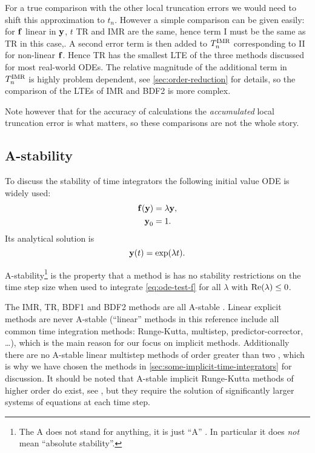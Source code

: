 For a true comparison with the other local truncation errors we would need to shift this approximation to $t_n$.
However a simple comparison can be given easily: for ${\boldsymbol{\mathrm{f}}}$ linear in $\boldsymbol{\mathrm{y}}$, $t$ TR and IMR are the same, hence term I must be the same as TR in this case,.
A second error term is then added to $T_n^{\mathrm{IMR}}$ corresponding to II for non-linear ${\boldsymbol{\mathrm{f}}}$.
Hence TR has the smallest LTE of the three methods discussed for most real-world ODEs.
The relative magnitude of the additional term in $T_n^{\mathrm{IMR}}$ is highly problem dependent, see \cref{sec:order-reduction} for details, so the comparison of the LTEs of IMR and BDF2 is more complex.

Note however that for the accuracy of calculations the \emph{accumulated} local truncation error is what matters, so these comparisons are not the whole story.

\subsection{A-stability}
\label{sec:A-stability}

To discuss the stability of time integrators the following initial value ODE is widely used:
\begin{equation}
  \begin{aligned}
    {\boldsymbol{\mathrm{f}}{\left( \boldsymbol{\mathrm{y}}\right)}} &= \lambda \boldsymbol{\mathrm{y}}, \\
    \boldsymbol{\mathrm{y}}_0 &= 1.
    \label{eq:ode-test-f}
  \end{aligned}
\end{equation}
Its analytical solution is
\begin{equation}
  \boldsymbol{\mathrm{y}}(t) = \exp(\lambda t).
\end{equation}

A-stability\footnote{The A does not stand for anything, it is just ``A'' \cite[40]{HairerWanner}. In particular it does \emph{not} mean ``absolute stability''.} is the property that a method is has no stability restrictions on the time step size when used to integrate \cref{eq:ode-test-f} for all $\lambda$ with $\operatorname{Re}(\lambda) \leq 0$.

The IMR, TR, BDF1 and BDF2 methods are all A-stable \cite[pgs. 43, 251]{HairerWanner}.
Linear explicit methods are never A-stable \cite{Nevanlinna1974} (``linear'' methods in this reference include all common time integration methods: Runge-Kutta, multistep, predictor-corrector, \ldots), which is the main reason for our focus on implicit methods.
Additionally there are no A-stable linear multistep methods of order greater than two \cite[261]{GreshoSani}, which is why we have chosen the  methods in \cref{sec:some-implicit-time-integrators} for discussion.
It should be noted that A-stable implicit Runge-Kutta methods of higher order do exist, see \eg \cite[73]{HairerWanner}, but they require the solution of significantly larger systems of equations at each time step.

